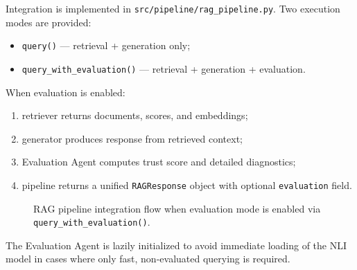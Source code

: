 Integration is implemented in \texttt{src/pipeline/rag\_pipeline.py}. Two execution modes are provided:
\begin{itemize}
    \item \texttt{query()} --- retrieval + generation only;
    \item \texttt{query\_with\_evaluation()} --- retrieval + generation + evaluation.
\end{itemize}

When evaluation is enabled:
\begin{enumerate}
    \item retriever returns documents, scores, and embeddings;
    \item generator produces response from retrieved context;
    \item Evaluation Agent computes trust score and detailed diagnostics;
    \item pipeline returns a unified \texttt{RAGResponse} object with optional \texttt{evaluation} field.
\end{enumerate}

\begin{figure}[H]
\centering
{}
\caption{RAG pipeline integration flow when evaluation mode is enabled via \texttt{query\_with\_evaluation()}.}
\label{fig:pipeline_integration}
\end{figure}

The Evaluation Agent is lazily initialized to avoid immediate loading of the NLI model in cases where only fast, non-evaluated querying is required.

